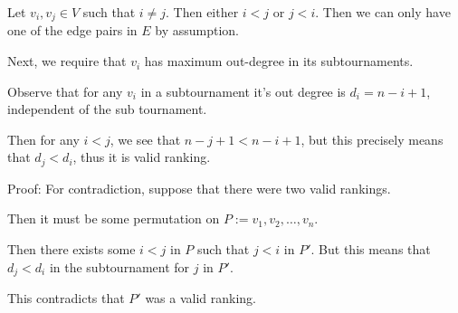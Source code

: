 \begin{soln}
	Let \(v_i, v_j \in V\) such that \(i \neq j\). Then either \(i < j\) or \(j < i\). Then we can only have one of the edge pairs in \(E\) by assumption.

	Next, we require that \(v_i\) has maximum out-degree in its subtournaments.

	Observe that for any \(v_i\) in a subtournament it's out degree is \(d_i = n - i + 1\), independent of the sub tournament.

	Then for any \(i < j\), we see that \(n - j + 1 < n - i + 1\), but this precisely means that \(d_j < d_i\), thus it is valid ranking.

	Proof: For contradiction, suppose that there were two valid rankings.

	Then it must be some permutation on \(P:= v_1, v_2, \dots, v_n\).

	Then there exists some \(i < j\) in \(P\) such that \(j < i\) in \(P'\). But this means that \(d_j < d_i\) in the subtournament for \(j\) in \(P'\).

	This contradicts that \(P'\) was a valid ranking.
\end{soln}
